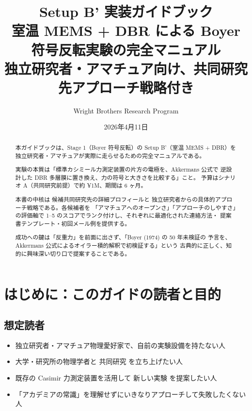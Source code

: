 \documentclass[11pt,a4paper]{article}
\title{Setup B' 実装ガイドブック\\[6pt]
\large 室温 MEMS + DBR による Boyer 符号反転実験の完全マニュアル\\[4pt]
\normalsize 独立研究者・アマチュア向け、共同研究先アプローチ戦略付き}
\author{Wright Brothers Research Program}
\date{2026年4月11日}
\def\textbf#1{#1}%
\begin{document}
\maketitle

\begin{abstract}
本ガイドブックは、Stage 1（Boyer 符号反転）の Setup B'（室温 MEMS + DBR）を
\textbf{独立研究者・アマチュア}が実際に走らせるための完全マニュアルである。

実験の本質は「標準カシミール力測定装置の片方の電極を、Akkermans 公式で
逆設計した DBR 多層膜に置き換え、力の符号と大きさを比較する」こと。
予算はシナリオ A（共同研究前提）で約 ¥1M、期間は 6 ヶ月。

本書の中核は \textbf{候補共同研究先の詳細プロフィール}と
\textbf{独立研究者からの具体的アプローチ戦略}である。各候補者を
「アマチュアへのオープンさ」「アプローチのしやすさ」の評価軸で
1--5 のスコアでランク付けし、それぞれに最適化された連絡方法・
提案書テンプレート・初回メール例を提供する。

成功への鍵は「反重力」を前面に出さず、\textbf{「Boyer (1974) の 50 年未検証の
予言を、Akkermans 公式によるオイラー積的解釈で初検証する」}という
古典的に正しく、知的に興味深い切り口で提案することである。
\end{abstract}

\tableofcontents
\newpage

\section{はじめに：このガイドの読者と目的}

\subsection{想定読者}

\begin{itemize}
\item 独立研究者・アマチュア物理愛好家で、自前の実験設備を持たない人
\item 大学・研究所の物理学者と \textbf{共同研究} を立ち上げたい人
\item 既存の Casimir 力測定装置を活用して \textbf{新しい実験} を提案したい人
\item 「アカデミアの常識」を理解せずにいきなりアプローチして失敗したくない人
\end{itemize}
\end{document}
